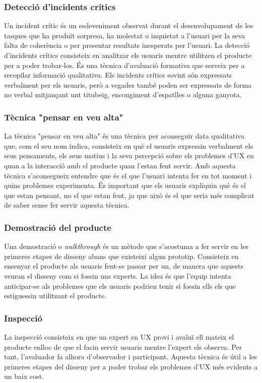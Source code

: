 \subsubsection{Detecció d'incidents crítics}
Un incident crític és un esdeveniment observat durant el desenvolupament de les tasques que ha produït sorpresa, ha molestat o inquietat a l'usuari per la seva falta de coherència o per presentar resultats inesperats per l'usuari. La detecció d'incidents crítics consisteix en analitzar els usuaris mentre utilitzen el producte per a poder trobar-los. És una tècnica d'avaluació formativa que serveix per a recopilar informació qualitativa. Els incidents crítics sovint són expressats verbalment per els usuaris, però a vegades també poden ser expressats de forma no verbal mitjançant unt titubeig, encongiment d'espatlles o alguna ganyota. 
\subsubsection{Tècnica "pensar en veu alta"}
La tècnica "pensar en veu alta" és una tècnica per aconseguir data qualitativa que, com el seu nom indica, consisteix en què el usuaris expressin verbalment els seus pensaments, els seus motius i la seva percepció sobre els problemes d'\ac{UX} en quan a la interacció amb el producte quan l'estan fent servir. Amb aquesta tècnica s'aconsegueix entendre que és el que l'usuari intenta fer en tot moment i quins problemes experimenta.
És important que els usuaris expliquin què és el que estan pensant, no el que estan fent, ja que això és el que seria més complicat de saber sense fer servir aquesta tècnica.  
\subsubsection{Demostració del producte}
Una demostració o \textit{walkthrough} és un mètode que s'acostuma a fer servir en les primeres etapes de disseny abans que existeixi algun prototip. Consisteix en ensenyar el producte als usuaris fent-se passar per un, de manera que aquests veuran el disseny com si fossin uns experts. La idea és que l'equip intenta anticipar-se als problemes que els usuaris podrien tenir si fossin ells els que estiguessin utilitzant el producte. 
\subsubsection{Inspecció} 
La inspecció consisteix en que un expert en UX provi i avaluï ell mateix el producte enlloc de que el facin servir usuaris mentre l'expert els observa. Per tant, l'avaluador fa alhora d'observador i participant. Aquesta tècnica és útil a les primeres etapes del disseny per a poder trobar els problemes d'\ac{UX} més evidents a un baix cost. 
